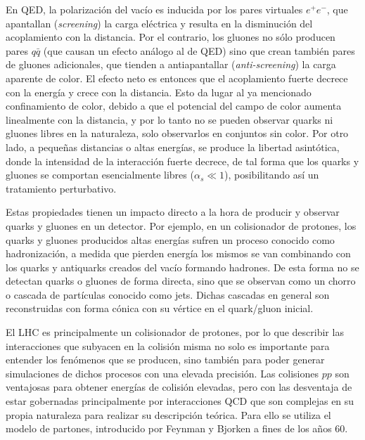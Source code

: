 En QED, la polarización del vacío es inducida por los
pares virtuales $e^{+}e^{-}$, que apantallan (\textit{screening}) la carga eléctrica y resulta en la disminución del
acoplamiento con la distancia. Por el contrario, los gluones no sólo producen pares $q\bar{q}$ (que
causan un efecto análogo al de QED) sino que crean también pares de gluones adicionales,
que tienden a antiapantallar (\textit{anti-screening}) la carga aparente de color. El efecto neto es entonces que
el acoplamiento fuerte decrece con la energía y crece con la distancia. Esto da lugar al ya mencionado confinamiento de color, debido a que el potencial del campo de color aumenta linealmente con la distancia, y por lo tanto no se pueden observar quarks ni gluones libres en la naturaleza, solo observarlos en conjuntos sin color. Por otro lado, a pequeñas distancias o altas energías, se produce la libertad asintótica, donde la intensidad de
la interacción fuerte decrece, de tal forma que los quarks y gluones se comportan
esencialmente libres ($\alpha_s \ll 1$), posibilitando así un tratamiento perturbativo. 

Estas propiedades tienen un impacto directo a la hora de producir y observar quarks y gluones en un detector. Por ejemplo, en un colisionador de protones, los quarks y
gluones producidos altas energías sufren un proceso conocido como hadronización,
a medida que pierden energía los mismos se van combinando con los quarks y antiquarks creados del vacío formando hadrones. De esta forma no se detectan quarks o gluones de forma directa, sino que se observan como un chorro o cascada de partículas conocido como jets. Dichas cascadas en general son reconstruidas con forma cónica con su vértice en el quark/gluon inicial. 




El LHC es principalmente un colisionador de protones, por lo que describir las interacciones que subyacen en la colisión misma no solo es importante para entender los fenómenos que se producen, sino también para poder generar simulaciones de dichos procesos con una elevada precisión. Las colisiones $pp$ son ventajosas para obtener energías de colisión elevadas, pero con las desventaja de estar gobernadas principalmente por interacciones QCD que son complejas en su propia naturaleza para realizar su descripción teórica. Para ello se utiliza el modelo de partones, introducido por Feynman \cite{feynman} y Bjorken \cite{bjorken} a fines de los años 60. 

